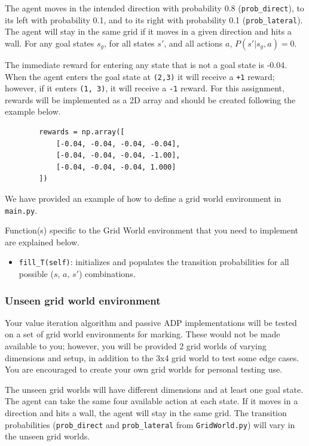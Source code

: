 \documentclass[12pt]{article}
\begin{document}
The agent moves in the intended direction with probability 0.8 (\texttt{prob\_direct}), to its left with probability 0.1, and to its right with probability 0.1 (\texttt{prob\_lateral}). The agent will stay in the same grid if it moves in a given direction and hits a wall. For any goal states $s_g$, for all states $s'$, and all actions $a$, $P(s' | s_g, a) = 0$.

The immediate reward for entering any state that is not a goal state is -0.04. When the agent enters the goal state at \texttt{(2,3)} it will receive a \texttt{+1} reward; however, if it enters \texttt{(1, 3)}, it will receive a \texttt{-1} reward. For this assignment, rewards will be implemented as a 2D array and should be created following the example below.
    \begin{verbatim}
        rewards = np.array([
            [-0.04, -0.04, -0.04, -0.04],
            [-0.04, -0.04, -0.04, -1.00],
            [-0.04, -0.04, -0.04, 1.000]
        ])
    \end{verbatim} 
    \vspace{-20pt}

We have provided an example of how to define a grid world environment in \texttt{main.py}.

Function(s) specific to the Grid World environment that you need to implement are explained below.

\begin{itemize}
    \item \texttt{fill\_T(self)}: initializes and populates the transition probabilities for all possible ($s,\, a,\, s'$) combinations.
\end{itemize}

\subsubsection*{Unseen grid world environment} \label{sec:unseen_env}
Your value iteration algorithm and passive ADP implementations will be tested on a set of grid world environments for marking. These would not be made available to you; however, you will be provided 2 grid worlds of varying dimensions and setup, in addition to the 3x4 grid world to test some edge cases. You are encouraged to create your own grid worlds for personal testing use.

The unseen grid worlds will have different dimensions and at least one goal state. The agent can take the same four available action at each state. If it moves in a direction and hits a wall, the agent will stay in the same grid. The transition probabilities (\texttt{prob\_direct} and \texttt{prob\_lateral} from \texttt{GridWorld.py}) will vary in the unseen grid worlds.
\end{document}
